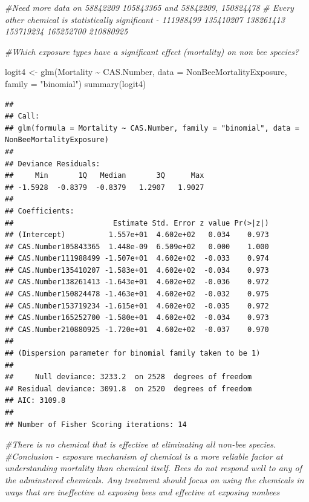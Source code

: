 \documentclass[
  12pt,
]{article}
\newenvironment{Shaded}{\begin{snugshade}}{\end{snugshade}}
\newcommand{\AttributeTok}[1]{\textcolor[rgb]{0.77,0.63,0.00}{#1}}
\newcommand{\CommentTok}[1]{\textcolor[rgb]{0.56,0.35,0.01}{\textit{#1}}}
\newcommand{\FunctionTok}[1]{\textcolor[rgb]{0.00,0.00,0.00}{#1}}
\newcommand{\NormalTok}[1]{#1}
\newcommand{\OtherTok}[1]{\textcolor[rgb]{0.56,0.35,0.01}{#1}}
\newcommand{\SpecialCharTok}[1]{\textcolor[rgb]{0.00,0.00,0.00}{#1}}
\newcommand{\StringTok}[1]{\textcolor[rgb]{0.31,0.60,0.02}{#1}}
\begin{document}
\begin{Shaded}
\begin{Highlighting}[]
 \CommentTok{\#Need more data on 58842209 105843365 and 58842209, 150824478}
 \CommentTok{\# Every other chemical is statistically significant {-} 111988499 135410207 138261413  153719234 165252700 210880925 }
\end{Highlighting}
\end{Shaded}

\begin{Shaded}
\begin{Highlighting}[]
\CommentTok{\#Which exposure types have a significant effect (mortality) on non bee species?}

\NormalTok{logit4 }\OtherTok{\textless{}{-}} \FunctionTok{glm}\NormalTok{(Mortality }\SpecialCharTok{\textasciitilde{}}\NormalTok{ CAS.Number, }\AttributeTok{data =}\NormalTok{ NonBeeMortalityExposure, }\AttributeTok{family =} \StringTok{"binomial"}\NormalTok{)}
\FunctionTok{summary}\NormalTok{(logit4)}
\end{Highlighting}
\end{Shaded}

\begin{verbatim}
## 
## Call:
## glm(formula = Mortality ~ CAS.Number, family = "binomial", data = NonBeeMortalityExposure)
## 
## Deviance Residuals: 
##     Min       1Q   Median       3Q      Max  
## -1.5928  -0.8379  -0.8379   1.2907   1.9027  
## 
## Coefficients:
##                       Estimate Std. Error z value Pr(>|z|)
## (Intercept)          1.557e+01  4.602e+02   0.034    0.973
## CAS.Number105843365  1.448e-09  6.509e+02   0.000    1.000
## CAS.Number111988499 -1.507e+01  4.602e+02  -0.033    0.974
## CAS.Number135410207 -1.583e+01  4.602e+02  -0.034    0.973
## CAS.Number138261413 -1.643e+01  4.602e+02  -0.036    0.972
## CAS.Number150824478 -1.463e+01  4.602e+02  -0.032    0.975
## CAS.Number153719234 -1.615e+01  4.602e+02  -0.035    0.972
## CAS.Number165252700 -1.580e+01  4.602e+02  -0.034    0.973
## CAS.Number210880925 -1.720e+01  4.602e+02  -0.037    0.970
## 
## (Dispersion parameter for binomial family taken to be 1)
## 
##     Null deviance: 3233.2  on 2528  degrees of freedom
## Residual deviance: 3091.8  on 2520  degrees of freedom
## AIC: 3109.8
## 
## Number of Fisher Scoring iterations: 14
\end{verbatim}

\begin{Shaded}
\begin{Highlighting}[]
 \CommentTok{\#There is no chemical that is effective at eliminating all non{-}bee species. }
 \CommentTok{\#Conclusion {-} exposure mechanism of chemical is a more reliable factor at understanding mortality than chemical itself. Bees do not respond well to any of the adminstered chemicals. Any treatment should focus on using the chemicals in ways that are ineffective at exposing bees and effective at exposing nonbees}
\end{Highlighting}
\end{Shaded}
\end{document}
